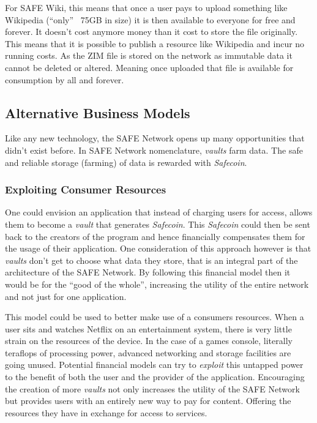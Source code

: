 For SAFE Wiki, this means that once a user pays to upload something like Wikipedia (``only'' ~75GB in size) it is then available to everyone for free and forever. It doesn't cost anymore money than it cost to store the file originally. This means that it is possible to publish a resource like Wikipedia and incur no running costs. As the ZIM file is stored on the network as immutable data it cannot be deleted or altered. Meaning once uploaded that file is available for consumption by all and forever.
 
\subsection{Alternative Business Models}

Like any new technology, the SAFE Network opens up many opportunities that didn't exist before. In SAFE Network nomenclature, \textit{vaults} farm data. The safe and reliable storage (farming) of data is rewarded with \textit{Safecoin}. 

\subsubsection{Exploiting Consumer Resources}

One could envision an application that instead of charging users for access, allows them to become a \textit{vault} that generates \textit{Safecoin}. This \textit{Safecoin} could then be sent back to the creators of the program and hence financially compensates them for the usage of their application. One consideration of this approach however is that \textit{vaults} don't get to choose what data they store, that is an integral part of the architecture of the SAFE Network. By following this financial model then it would be for the ``good of the whole'', increasing the utility of the entire network and not just for one application.

This model could be used to better make use of a consumers resources. When a user sits and watches Netflix on an entertainment system, there is very little strain on the resources of the device. In the case of a games console, literally teraflops of processing power, advanced networking and storage facilities are going unused. Potential financial models can try to \textit{exploit} this untapped power to the benefit of both the user and the provider of the application. Encouraging the creation of more \textit{vaults} not only increases the utility of the SAFE Network but provides users with an entirely new way to pay for content. Offering the resources they have in exchange for access to services.

